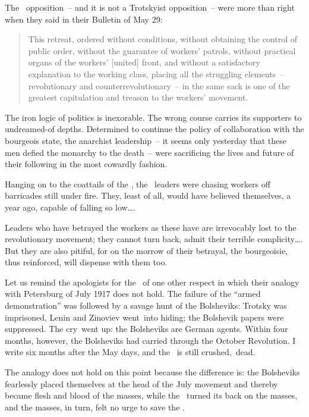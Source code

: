 The \POUM\ opposition~-- and it is not a Trotskyist opposition~-- were more than right when they said in their Bulletin of May 29:

\begin{quotation}
  This retreat, ordered without conditions, without obtaining the control of public order, without the guarantee of workers’ patrols, without practical organs of the workers’ [united] front, and without a satisfactory explanation to the working class, placing all the struggling elements~-- revolutionary and counterrevolutionary~-- in the same sack is one of the greatest capitulation and treason to the workers’ movement.
\end{quotation}

The iron logic of politics is inexorable. The wrong course carries its supporters to undreamed-of depths. Determined to continue the policy of collaboration with the bourgeois state, the anarchist leadership~-- it seems only yesterday that these men defied the monarchy to the death~-- were sacrificing the lives and future of their following in the most cowardly fashion.

Hanging on to the coattails of the \CNT\kn, the \POUM\ leaders were chasing workers off barricades still under fire. They, least of all, would have believed themselves, a year ago, capable of falling so low\dots.

Leaders who have betrayed the workers as these have are irrevocably lost to the revolutionary movement; they cannot turn back, admit their terrible complicity\dots. But they are also pitiful, for on the morrow of their betrayal, the bourgeoisie, thus reinforced, will dispense with them too.

Let us remind the apologists for the \POUM\ of one other respect in which their analogy with Petersburg of July 1917 does not hold. The failure of the ``armed demonstration'' was followed by a savage hunt of the Bolsheviks: Trotsky was imprisoned, Lenin and Zinoviev went~into hiding; the Bolshevik papers were suppressed. The cry~went up: the Bolsheviks are German agents. Within four months, however, the Bolsheviks had carried through the October Revolution. I write six months after the May days, and the \POUM\ is still crushed,~dead. 

The analogy does not hold on this point because the difference is: the Bolsheviks fearlessly placed themselves at the head of the July movement and thereby became flesh and blood of the masses, while the \POUM\ turned its back on the masses, and the masses, in turn, felt no urge to save the \POUM\kn.